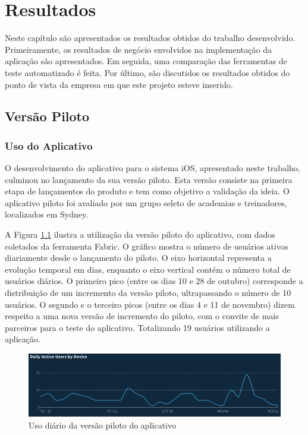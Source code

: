 \chapter{Resultados} \label{cap:results}
Neste capítulo são apresentados os resultados obtidos do trabalho desenvolvido. Primeiramente, os resultados de negócio envolvidos na implementação da aplicação são apresentados. Em seguida, uma comparação das ferramentas de teste automatizado é feita. Por último, são discutidos os resultados obtidos do ponto de vista da empresa em que este projeto esteve inserido.

\section{Versão Piloto}
\subsection{Uso do Aplicativo}
O desenvolvimento do aplicativo para o sistema iOS, apresentado neste trabalho, culminou no lançamento da sua versão piloto. Esta versão consiste na primeira etapa de lançamentos do produto e tem como objetivo a validação da ideia. O aplicativo piloto foi avaliado por um grupo seleto de academias e treinadores, localizados em Sydney.

A Figura \ref{fig:pilot-use} ilustra a utilização da versão piloto do aplicativo, com dados coletados da ferramenta Fabric. O gráfico mostra o número de usuários ativos diariamente desde o lançamento do piloto. O eixo horizontal representa a evolução temporal em dias, enquanto o eixo vertical contém o número total de usuários diários. O primeiro pico (entre os dias 10 e 28 de outubro) corresponde a distribuição de um incremento da versão piloto, ultrapassando o número de 10 usuários. O segundo e o terceiro picos (entre os dias 4 e 11 de novembro) dizem respeito a uma nova versão de incremento do piloto, com o convite de mais parceiros para o teste do aplicativo. Totalizando 19 usuários utilizando a aplicação.

\begin{figure}[H]
    \centering
    \includegraphics[width=\textwidth]{pfc/figuras/pilot-use.png}
    \caption{Uso diário da versão piloto do aplicativo}
    \label{fig:pilot-use}
\end{figure}

